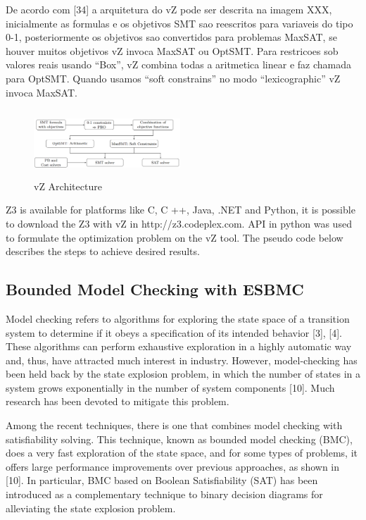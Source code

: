 De acordo com [34] a arquitetura do vZ pode ser descrita na imagem XXX, inicialmente as formulas e os objetivos SMT sao reescritos para variaveis do tipo 0-1, posteriormente os objetivos sao convertidos para problemas MaxSAT, se houver muitos objetivos vZ invoca MaxSAT ou OptSMT. Para restricoes sob valores reais usando “Box”, vZ combina todas a aritmetica linear e faz chamada para OptSMT. Quando usamos “soft constrains” no modo “lexicographic” vZ invoca MaxSAT.
\begin{figure}[ht]
	\centering
  \includegraphics[width=0.49\textwidth, height=95px]{Image/vzArch.png} 
	\caption{vZ Architecture}
	\label{fig2}
\end{figure}

Z3 is available for platforms like C, C ++, Java, .NET and Python, it is possible to download the Z3 with vZ in http://z3.codeplex.com. API in python was used to formulate the optimization problem on the vZ tool. The pseudo code below describes the steps to achieve desired results.

\subsection{Bounded Model Checking with ESBMC}
Model checking refers to algorithms for exploring the state space of a transition system to determine if it obeys a speciﬁcation of its intended behavior [3], [4]. These algorithms can perform exhaustive exploration in a highly automatic way and, thus, have attracted much interest in industry. However, model-checking has been held back by the state explosion problem, in which the number of states in a system grows exponentially in the number of system components [10]. Much research has been devoted to mitigate this problem.

Among the recent techniques, there is one that combines model checking with satisﬁability solving. This technique, known as bounded model checking (BMC), does a very fast exploration of the state space, and for some types of problems, it offers large performance improvements over previous approaches, as shown in [10]. In particular, BMC based on Boolean Satisfiability (SAT) has been introduced as a complementary technique to binary decision diagrams for alleviating the state explosion problem. 

